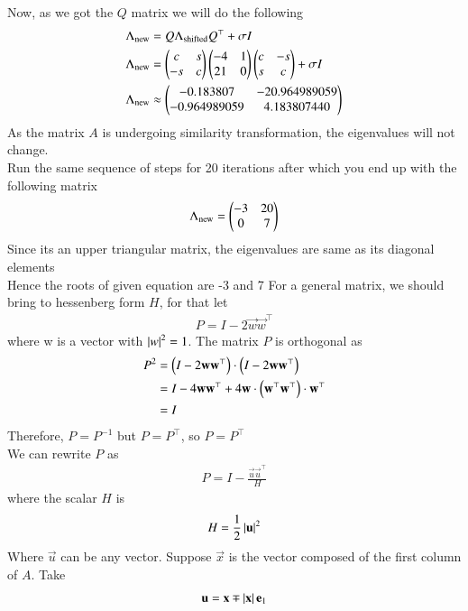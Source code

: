 \documentclass[journal]{IEEEtran}
\begin{document}
	Now, as we got the $Q$ matrix we will do the following
	\begin{align}
		\Lambda_{\text{new}} &= Q\Lambda_{\text{shifted}}Q^\top + \sigma I\\
		\Lambda_{\text{new}} &= \begin{pmatrix}c & s\\-s & c\end{pmatrix}\begin{pmatrix}-4 & 1\\ 21 & 0\end{pmatrix}\begin{pmatrix}c & -s\\s & c\end{pmatrix} + \sigma I\\
		\Lambda_{\text{new}} &\approx \begin{pmatrix}-0.183807 & -20.964989059\\-0.964989059 & 4.183807440\end{pmatrix} 
	\end{align}
	As the matrix $A$ is undergoing similarity transformation, the eigenvalues will not change.\\
	Run the same sequence of steps for 20 iterations after which you end up with the following matrix
	\begin{align}
		\Lambda_{\text{new}} = \begin{pmatrix}-3 & 20\\ 0 & 7\end{pmatrix}
	\end{align}
	Since its an upper triangular matrix, the eigenvalues are same as its diagonal elements\\
	Hence the roots of given equation are -3 and 7\newline \newline
	For a general matrix, we should bring to hessenberg form $H$, for that let
	\begin{align}
		P = I-2\vec{w}\vec{w}^\top
	\end{align}
	where w is a vector with $\left\vert w\right\vert^2=1$. The matrix $P$ is orthogonal as
	\begin{align}
		P^2 &=\left(I - 2\mathbf{w}\mathbf{w}^\top\right)\cdot\left(I - 2\mathbf{w}\mathbf{w}^\top\right)\\
		&=I-4\mathbf{w}\mathbf{w}^\top + 4\mathbf{w}\cdot\left(\mathbf{w}^\top\mathbf{w}^\top\right)\cdot\mathbf{w}^\top\\
		&=I
	\end{align}
	Therefore, $P=P^{-1}$ but $P = P^\top$, so $P = P^\top$ \\
	We can rewrite $P$ as
	\begin{align}
		P = I - \frac{\vec{u}\vec{u}^\top}{H}
	\end{align}
	where the scalar $H$ is
	\begin{align}
		H = \frac{1}{2}\left\vert\mathbf{u}\right\vert^2
	\end{align}
	Where $\vec{u}$ can be any vector. Suppose $\vec{x}$ is the vector composed of the first column of $A$. Take
	\begin{align}
		\mathbf{u} = \mathbf{x} \mp \left\vert\mathbf{x}\right\vert\mathbf{e}_1
	\end{align}
\end{document}
